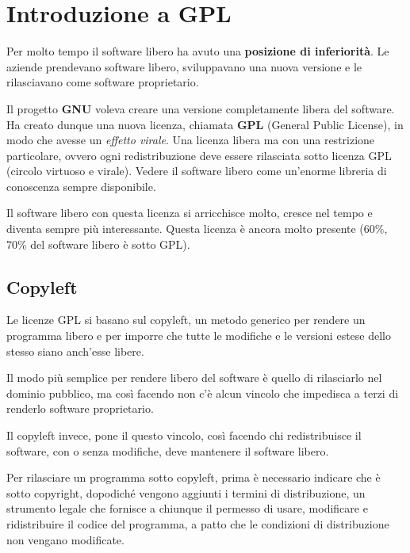 \section{Introduzione a GPL}

Per molto tempo il software libero ha avuto una \textbf{posizione di inferiorità}. Le aziende prendevano software libero, sviluppavano una nuova versione e le rilasciavano come software proprietario. 

Il progetto \textbf{GNU} voleva creare una versione completamente libera del software. Ha creato dunque una nuova licenza, chiamata \textbf{GPL} (General Public License), in modo che avesse un \textit{effetto virale}. Una licenza libera ma con una restrizione particolare, ovvero ogni redistribuzione deve essere rilasciata sotto licenza GPL (circolo virtuoso e virale). Vedere il software libero come un'enorme libreria di conoscenza sempre disponibile.

Il software libero con questa licenza si arricchisce molto, cresce nel tempo e diventa sempre più interessante. Questa licenza è ancora molto presente (60\%, 70\% del software libero è sotto GPL).

\subsection{Copyleft}

Le licenze GPL si basano sul copyleft, un metodo generico per rendere un programma libero e per imporre che tutte le modifiche e le versioni estese dello stesso siano anch'esse libere.

Il modo più semplice per rendere libero del software è quello di rilasciarlo nel dominio pubblico, ma così facendo non c'è alcun vincolo che impedisca a terzi di renderlo software proprietario.

Il copyleft invece, pone il questo vincolo, così facendo chi redistribuisce il software, con o senza modifiche, deve mantenere il software libero.

Per rilasciare un programma sotto copyleft, prima è necessario indicare che è sotto copyright, dopodiché vengono aggiunti i termini di distribuzione, un strumento legale che fornisce a chiunque il permesso di usare, modificare e ridistribuire il codice del programma, a patto che le condizioni di distribuzione non vengano modificate.